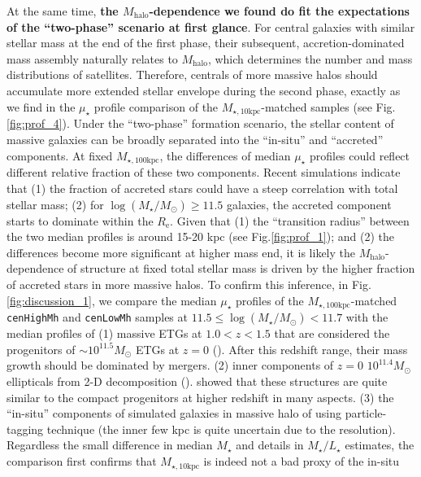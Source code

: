 \documentclass{emulateapj}
\def\rbcg{\texttt{cenHighMh}}
\def\nbcg{\texttt{cenLowMh}}
\def\mstar{{$M_{\star}$}}
\def\mhalo{{$M_{\mathrm{halo}}$}}
\def\logms{{$\log (M_{\star}/M_{\odot})$}}
\def\minn{{$M_{\star,10\mathrm{kpc}}$}}
\def\mtot{{$M_{\star,100\mathrm{kpc}}$}}
\def\m2l{{$M_{\star}/L_{\star}$}}
\def\mden{{$\mu_{\star}$}}
\begin{document}
\begin{CJK*}{UTF8}{gbsn}
    At the same time, \textbf{the \mhalo{}-dependence we found do fit the expectations 
    of the ``two-phase'' scenario at first glance}. 
    For central galaxies with similar stellar mass at the end of the first phase, 
    their subsequent, accretion-dominated mass assembly naturally relates to \mhalo{}, 
    which determines the number and mass distributions of satellites. 
    Therefore, centrals of more massive halos should accumulate more extended stellar 
    envelope during the second phase, exactly as we find in the \mden{} profile 
    comparison of the \minn{}-matched samples (see Fig.\ref{fig:prof_4}).
    Under the ``two-phase'' formation scenario, the stellar content of massive galaxies
    can be broadly separated into the ``in-situ'' and ``accreted'' components. 
    At fixed \mtot{}, the differences of median \mden{} profiles could reflect 
    different relative fraction of these two components. 
    Recent simulations indicate that (1) the fraction of accreted stars could have 
    a steep correlation with total stellar mass; (2) for \logms$\geq 11.5$ galaxies,
    the accreted component starts to dominate within the $R_{\mathrm{e}}$.  
    Given that (1) the ``transition radius'' between the two median profiles is around
    15-20 kpc (see Fig.\ref{fig:prof_1}); and (2) the differences become more 
    significant at higher mass end, it is likely the \mhalo{}-dependence of structure
    at fixed total stellar mass is driven by the higher fraction of accreted stars 
    in more massive halos.  
    To confirm this inference, in Fig.\ref{fig:discussion_1}, we compare the median 
    \mden{} profiles of the \mtot{}-matched \rbcg{} and \nbcg{} samples at 
    $11.5\leq$\logms{}$<11.7$ with the median profiles of 
    (1) massive ETGs at $1.0 < z < 1.5$ that are considered the progenitors of 
    $\sim 10^{11.5} M_{\odot}$ ETGs at $z=0$ (\citealt{Patel2013}).  
    After this redshift range, their mass growth should be dominated by mergers.  
    (2) inner components of $z=0$ $10^{11.4} M_{\odot}$ ellipticals from 2-D decomposition
    (\citealt{Huang2013a}). 
    \citep{Huang2013b} showed that these structures are quite similar to the compact 
    progenitors at higher redshift in many aspects.  
    (3) the ``in-situ'' components of simulated galaxies in massive halo of 
    \citep{Cooper13} using particle-tagging technique (the inner few kpc is quite 
    uncertain due to the resolution).  
    Regardless the small difference in median \mstar{} and details in \m2l{} estimates, 
    the comparison first confirms that \minn{} is indeed not a bad proxy of the in-situ 

\end{CJK*}
\end{document}
